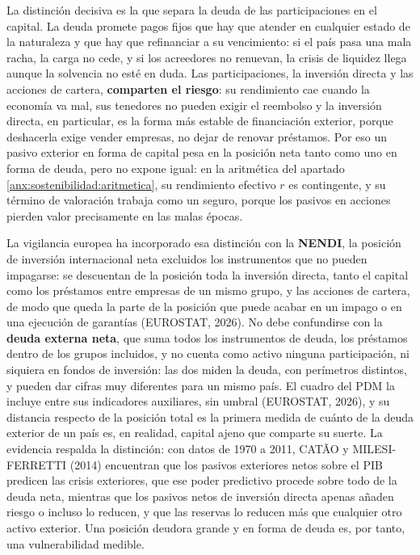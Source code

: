 \documentclass[10pt,a4paper]{article}
\begin{document}
La distinción decisiva es la que separa la deuda de las participaciones en el capital. La deuda promete pagos fijos que hay que atender en cualquier estado de la naturaleza y que hay que refinanciar a su vencimiento: si el país pasa una mala racha, la carga no cede, y si los acreedores no renuevan, la crisis de liquidez llega aunque la solvencia no esté en duda. Las participaciones, la inversión directa y las acciones de cartera, \textbf{comparten el riesgo}: su rendimiento cae cuando la economía va mal, sus tenedores no pueden exigir el reembolso y la inversión directa, en particular, es la forma más estable de financiación exterior, porque deshacerla exige vender empresas, no dejar de renovar préstamos. Por eso un pasivo exterior en forma de capital pesa en la posición neta tanto como uno en forma de deuda, pero no expone igual: en la aritmética del apartado \ref{anx:sostenibilidad:aritmetica}, su rendimiento efectivo $r$ es contingente, y su término de valoración trabaja como un seguro, porque los pasivos en acciones pierden valor precisamente en las malas épocas.

La vigilancia europea ha incorporado esa distinción con la \textbf{NENDI}, la posición de inversión internacional neta excluidos los instrumentos que no pueden impagarse: se descuentan de la posición toda la inversión directa, tanto el capital como los préstamos entre empresas de un mismo grupo, y las acciones de cartera, de modo que queda la parte de la posición que puede acabar en un impago o en una ejecución de garantías (EUROSTAT, 2026). No debe confundirse con la \textbf{deuda externa neta}, que suma todos los instrumentos de deuda, los préstamos dentro de los grupos incluidos, y no cuenta como activo ninguna participación, ni siquiera en fondos de inversión: las dos miden la deuda, con perímetros distintos, y pueden dar cifras muy diferentes para un mismo país. El cuadro del PDM la incluye entre sus indicadores auxiliares, sin umbral (EUROSTAT, 2026), y su distancia respecto de la posición total es la primera medida de cuánto de la deuda exterior de un país es, en realidad, capital ajeno que comparte su suerte. La evidencia respalda la distinción: con datos de 1970 a 2011, CATÃO y MILESI-FERRETTI (2014) encuentran que los pasivos exteriores netos sobre el PIB predicen las crisis exteriores, que ese poder predictivo procede sobre todo de la deuda neta, mientras que los pasivos netos de inversión directa apenas añaden riesgo o incluso lo reducen, y que las reservas lo reducen más que cualquier otro activo exterior. Una posición deudora grande y en forma de deuda es, por tanto, una vulnerabilidad medible.
\end{document}
